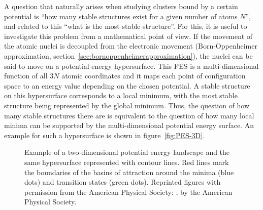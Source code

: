 A question that naturally arises when studying clusters bound by a certain
potential is ``how many stable structures exist for a given number of atoms
$N$'', and related to this ``what is the most stable structure''. For this, it is
useful to investigate this problem from a mathematical point of view. If the
movement of the atomic nuclei is decoupled from the electronic movement
(Born-Oppenheimer approximation,
section~\ref{sec:bornoppenheimerapproximation}), the nuclei can be said to move
on a potential energy hypersurface. This \ac{PES} is a multi-dimensional
function of all $3N$ atomic coordinates and it maps each point of configuration
space to an energy value depending on the chosen potential. A stable structure
on this hypersurface corresponds to a local minimum, with the most stable
structure being represented by the global minimum. Thus, the question of how
many stable structures there are is equivalent to the question of how many local
minima can be supported by the multi-dimensional potential energy surface. An
example for such a hypersurface is shown in figure~\ref{fig:PES-3D}.
%
\begin{figure}[htb]
    \centering
    \hspace{0.05\textwidth}
    \caption{\protect{} Example of a two-dimensional potential energy landscape and \protect{} the same hypersurface represented with contour lines. Red lines mark the boundaries of the basins of attraction around the minima (blue dots) and transition states (green dots). Reprinted figures with permission from the American Physical Society: \autocite{Massen_Powerlawdistributionsareas_2007},  by the American Physical Society.}
    \label{fig:PES}
\end{figure}
